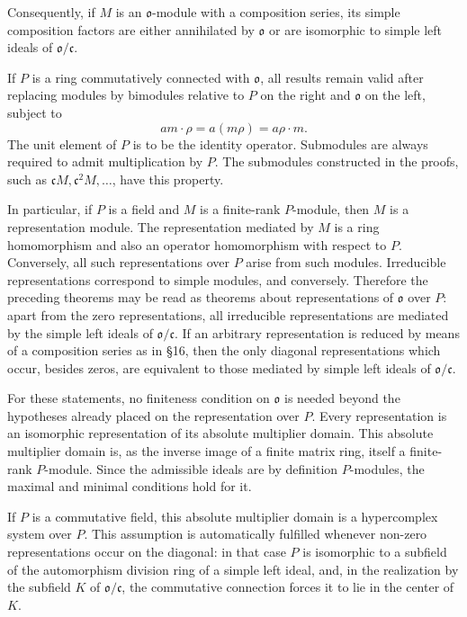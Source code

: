 \documentclass[
  11pt,
]{article}
\begin{document}
Consequently, if \(M\) is an \(\mathfrak{o}\)-module with a composition
series, its simple composition factors are either annihilated by
\(\mathfrak{o}\) or are isomorphic to simple left ideals of
\(\mathfrak{o}/\mathfrak c\).

If \(P\) is a ring commutatively connected with \(\mathfrak{o}\), all
results remain valid after replacing modules by bimodules relative to
\(P\) on the right and \(\mathfrak{o}\) on the left, subject to \[
  am\cdot\rho=a(m\rho)=a\rho\cdot m.
\] The unit element of \(P\) is to be the identity operator. Submodules
are always required to admit multiplication by \(P\). The submodules
constructed in the proofs, such as
\(\mathfrak cM,\mathfrak c^2M,\ldots\), have this property.

In particular, if \(P\) is a field and \(M\) is a finite-rank
\(P\)-module, then \(M\) is a representation module. The representation
mediated by \(M\) is a ring homomorphism and also an operator
homomorphism with respect to \(P\). Conversely, all such representations
over \(P\) arise from such modules. Irreducible representations
correspond to simple modules, and conversely. Therefore the preceding
theorems may be read as theorems about representations of
\(\mathfrak{o}\) over \(P\): apart from the zero representations, all
irreducible representations are mediated by the simple left ideals of
\(\mathfrak{o}/\mathfrak c\). If an arbitrary representation is reduced
by means of a composition series as in §16, then the only diagonal
representations which occur, besides zeros, are equivalent to those
mediated by simple left ideals of \(\mathfrak{o}/\mathfrak c\).

For these statements, no finiteness condition on \(\mathfrak{o}\) is
needed beyond the hypotheses already placed on the representation over
\(P\). Every representation is an isomorphic representation of its
absolute multiplier domain. This absolute multiplier domain is, as the
inverse image of a finite matrix ring, itself a finite-rank
\(P\)-module. Since the admissible ideals are by definition
\(P\)-modules, the maximal and minimal conditions hold for it.

If \(P\) is a commutative field, this absolute multiplier domain is a
hypercomplex system over \(P\). This assumption is automatically
fulfilled whenever non-zero representations occur on the diagonal: in
that case \(P\) is isomorphic to a subfield of the automorphism division
ring of a simple left ideal, and, in the realization by the subfield
\(K\) of \(\mathfrak{o}/\mathfrak c\), the commutative connection forces
it to lie in the center of \(K\).
\end{document}
